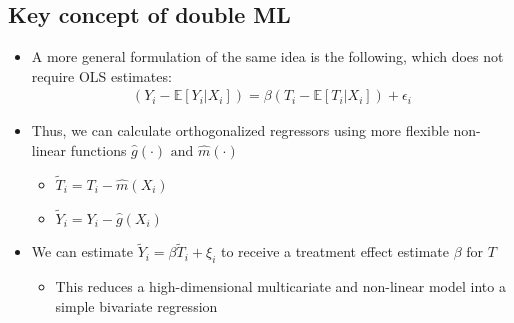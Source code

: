\documentclass[10pt]{article}
\begin{document}
\subsection{Key concept of double ML}
\begin{itemize}
    \item A more general formulation of the same idea is the following, which does not require OLS estimates: 
    \begin{gather*}
        (Y_i - \mathbb{E}[Y_i|X_i]) = \beta(T_i - \mathbb{E}[T_i|X_i]) + \epsilon_i
    \end{gather*}
    \item Thus, we can calculate orthogonalized regressors using more flexible non-linear functions $\hat{g}(\cdot) \text{ and } \hat{m}(\cdot) $
    \begin{itemize}
        \item $\tilde{T}_i = T_i - \hat{m}(X_i) $
        \item $\tilde{Y}_i = Y_i - \hat{g}(X_i) $
    \end{itemize}
    \item We can estimate $\tilde{Y}_i = \beta\tilde{T}_i + \xi_i $ to receive a treatment effect estimate $\beta \text{ for } T $
    \begin{itemize}
        \item This reduces a high-dimensional multicariate and non-linear model into a simple bivariate regression 
    \end{itemize}
\end{itemize}
\end{document}
